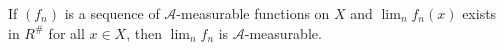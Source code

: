 If $(f_n)$ is a sequence of $\mathcal{A}$-measurable functions on $X$ and $\lim_n f_n(x)$ exists in $R^{\#}$ for all $x \in X$, then $\lim_n f_n$ is $\mathcal{A}$-measurable.
